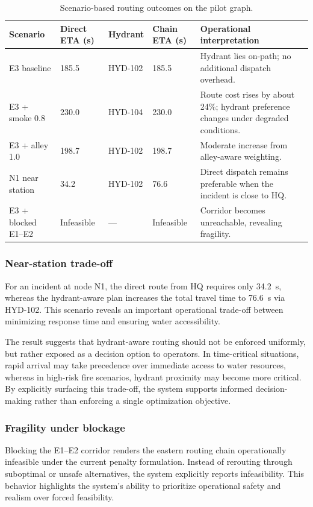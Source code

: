 \begin{table}[t]
\caption{Scenario-based routing outcomes on the pilot graph.}
\label{tab:scenarios}
\centering
\scriptsize
\setlength{\tabcolsep}{4pt}
\renewcommand{\arraystretch}{0.96}
\begin{tabular}{L{1.55cm} C{0.95cm} C{0.95cm} C{1.0cm} L{2.7cm}}
\toprule
Scenario & Direct ETA (s) & Hydrant & Chain ETA (s) & Operational interpretation \\
\midrule
E3 baseline & 185.5 & HYD-102 & 185.5 & Hydrant lies on-path; no additional dispatch overhead. \\
E3 + smoke 0.8 & 230.0 & HYD-104 & 230.0 & Route cost rises by about 24\%; hydrant preference changes under degraded conditions. \\
E3 + alley 1.0 & 198.7 & HYD-102 & 198.7 & Moderate increase from alley-aware weighting. \\
N1 near station & 34.2 & HYD-102 & 76.6 & Direct dispatch remains preferable when the incident is close to HQ. \\
E3 + blocked E1--E2 & Infeasible & --- & Infeasible & Corridor becomes unreachable, revealing fragility. \\
\bottomrule
\end{tabular}
\end{table}


\subsubsection{Near-station trade-off}
For an incident at node N1, the direct route from HQ requires only 34.2~s, whereas the hydrant-aware plan increases the total travel time to 76.6~s via HYD-102. This scenario reveals an important operational trade-off between minimizing response time and ensuring water accessibility.

The result suggests that hydrant-aware routing should not be enforced uniformly, but rather exposed as a decision option to operators. In time-critical situations, rapid arrival may take precedence over immediate access to water resources, whereas in high-risk fire scenarios, hydrant proximity may become more critical. By explicitly surfacing this trade-off, the system supports informed decision-making rather than enforcing a single optimization objective.


\subsubsection{Fragility under blockage}
Blocking the E1--E2 corridor renders the eastern routing chain operationally infeasible under the current penalty formulation. Instead of rerouting through suboptimal or unsafe alternatives, the system explicitly reports infeasibility. This behavior highlights the system’s ability to prioritize operational safety and realism over forced feasibility.


